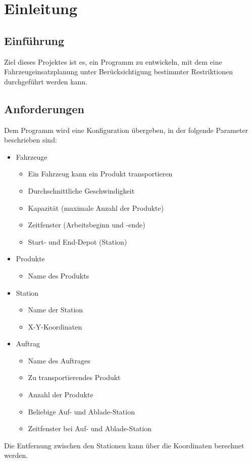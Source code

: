 \section{Einleitung}
\subsection{Einführung}
Ziel dieses Projektes ist es, ein Programm zu entwickeln, mit dem eine Fahrzeugeinsatzplanung unter Berücksichtigung bestimmter Restriktionen durchgeführt werden kann. 


\subsection{Anforderungen}
\label{sec:Anforderungen}
Dem Programm wird eine Konfiguration übergeben, in der folgende Parameter beschrieben sind:
\begin{itemize}
 \item Fahrzeuge
 \begin{itemize}
  \item Ein Fahrzeug kann ein Produkt transportieren
  \item Durchschnittliche Geschwindigkeit
  \item Kapazität (maximale Anzahl der Produkte)
  \item Zeitfenster (Arbeitsbeginn und -ende)
  \item Start- und End-Depot (Station)
 \end{itemize}
 \item Produkte
 \begin{itemize}
  \item Name des Produkts
 \end{itemize}
 \item Station
 \begin{itemize}
  \item Name der Station
  \item X-Y-Koordinaten
 \end{itemize}
 \item Auftrag
 \begin{itemize}
  \item Name des Auftrages
  \item Zu transportierendes Produkt
  \item Anzahl der Produkte
  \item Beliebige Auf- und Ablade-Station
  \item Zeitfenster bei Auf- und Ablade-Station
 \end{itemize}
\end{itemize}
Die Entfernung zwischen den Stationen kann über die Koordinaten berechnet werden. 


